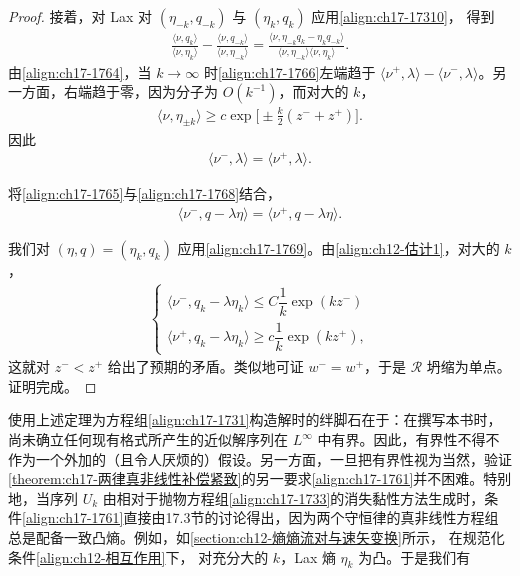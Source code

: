 \documentclass[../../main.tex]{subfiles}
\begin{document}
\begin{proof}
接着，对 Lax 对 $(\eta_{-k},q_{-k})$ 与 $(\eta_k,q_k)$ 应用\eqref{align:ch17-17310}，%
得到
\begin{align}
\frac{\langle\nu,q_k\rangle}{\langle\nu,\eta_k\rangle}-\frac{\langle\nu,q_{-k}\rangle}{\langle\nu,\eta_{-k}\rangle}=\frac{\langle\nu,\eta_{-k}q_k-\eta_kq_{-k}\rangle}{\langle\nu,\eta_{-k}\rangle\langle\nu,\eta_k\rangle}.
\label{align:ch17-1766}
\end{align}
由\eqref{align:ch17-1764}，当 $k\to\infty$ 时\eqref{align:ch17-1766}左端趋于 $\langle\nu^+,\lambda\rangle-\langle\nu^-,\lambda\rangle$。另一方面，右端趋于零，因为分子为 $O(k^{-1})$，而对大的 $k$，
\begin{align}
\langle\nu,\eta_{\pm k}\rangle\geqslant c\exp\bigl[\pm\tfrac{k}{2}(z^-+z^+)\bigr].
\label{align:ch17-1767}
\end{align}
因此
\begin{align}
\langle\nu^-,\lambda\rangle=\langle\nu^+,\lambda\rangle.
\label{align:ch17-1768}
\end{align}

将\eqref{align:ch17-1765}与\eqref{align:ch17-1768}结合，
\begin{align}
\langle\nu^-,q-\lambda\eta\rangle=\langle\nu^+,q-\lambda\eta\rangle.
\label{align:ch17-1769}
\end{align}

我们对 $(\eta,q)=(\eta_k,q_k)$ 应用\eqref{align:ch17-1769}。由\eqref{align:ch12-估计1}，对大的 $k$，
\begin{align}
\begin{cases}
\langle\nu^-,q_k-\lambda\eta_k\rangle\leqslant C\dfrac{1}{k}\exp(kz^-)\\
\langle\nu^+,q_k-\lambda\eta_k\rangle\geqslant c\dfrac{1}{k}\exp(kz^+),
\end{cases}
\label{align:ch17-17610}
\end{align}
这就对 $z^-<z^+$ 给出了预期的矛盾。类似地可证 $w^-=w^+$，于是 $\mathscr{R}$ 坍缩为单点。证明完成。
\end{proof}

使用上述定理为方程组\eqref{align:ch17-1731}构造解时的绊脚石在于：在撰写本书时，尚未确立任何现有格式所产生的近似解序列在 $L^\infty$ 中有界。因此，有界性不得不作为一个外加的（且令人厌烦的）假设。另一方面，一旦把有界性视为当然，验证\cref{theorem:ch17-两律真非线性补偿紧致}的另一要求\eqref{align:ch17-1761}并不困难。特别地，当序列 $U_k$ 由相对于抛物方程组\eqref{align:ch17-1733}的消失黏性方法生成时，条件\eqref{align:ch17-1761}直接由17.3节的讨论得出，因为两个守恒律的真非线性方程组总是配备一致凸熵。例如，如\cref{section:ch12-熵熵流对与速矢变换}所示，
在规范化条件\eqref{align:ch12-相互作用}下，
对充分大的 $k$，Lax 熵 $\eta_k$ 为凸。于是我们有
\end{document}
